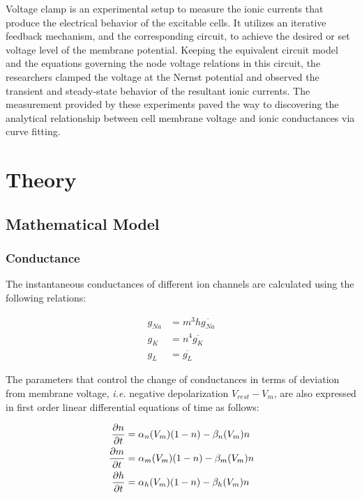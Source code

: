 \documentclass{IEEEtran}
\begin{document}
Voltage clamp is an experimental setup to measure the ionic currents that produce the electrical behavior of the excitable cells. It utilizes an iterative feedback mechanism, and the corresponding circuit, to achieve the desired or set voltage level of the membrane potential. Keeping the equivalent circuit model  and the equations governing the node voltage relations in this circuit, the researchers clamped the voltage at the Nernst potential and observed the transient and steady-state behavior of the resultant ionic currents. The measurement provided by these experiments paved the way to discovering the analytical relationship between cell membrane voltage and ionic conductances via curve fitting. 

\section{Theory}

\subsection{Mathematical Model}
\subsubsection*{Conductance}
The instantaneous conductances of different ion channels are calculated using the following relations:

\begin{align}
    g_{Na} &= m^3h \overline{g_{Na}} \\
    g_{K} &= n^4 \overline{g_K} \\
    g_{L} &= \overline{g_{L}}
\end{align}

The parameters that control the change of conductances in terms of deviation from membrane voltage, \textit{i.e.} negative depolarization $V_{rest} - V_m$, are also expressed in first order linear differential equations of time as follows:

\begin{align}
    \pdv{n}{t} &= \alpha_n(V_m)(1-n) - \beta_n(V_m)n \label{eqn:pdv1}\\
    \pdv{m}{t} &= \alpha_m(V_m)(1-n) - \beta_m(V_m)n \label{eqn:pdv2}\\
    \pdv{h}{t} &= \alpha_h(V_m)(1-n) - \beta_h(V_m)n \label{eqn:pdv3}\\
\end{align}
\end{document}
